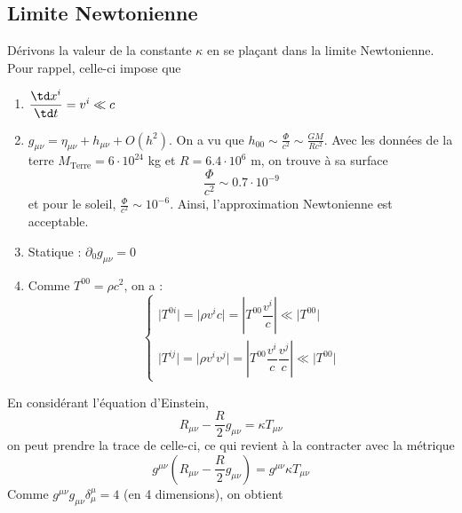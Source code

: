 \subsection{Limite Newtonienne}
Dérivons la valeur de la constante $\kappa$ en se plaçant dans la limite Newtonienne. Pour rappel, celle-ci impose que
\begin{theoremframe}
\begin{enumerate}
    \item $\dfrac{\td x^{i}}{\td t} = v^i \ll c$
    \item $g_{\mu \nu} = \eta_{\mu \nu} + h_{\mu \nu} + O(h^2)$. On a vu que $h_{00} \sim \frac{\Phi}{c^2} \sim \frac{GM}{R c^2}$. Avec les données de la terre $M_{\text{Terre}} = 6 \cdot10^{24}$ kg et $R = 6.4 \cdot 10^6$ m, on trouve à sa surface
    \begin{equation}
        \frac{\Phi}{c^2} \sim 0.7 \cdot 10^{-9}
    \end{equation}
    et pour le soleil, $\frac{\Phi}{c^2} \sim 10^{-6}$. Ainsi, l'approximation Newtonienne est acceptable.
    \item Statique : $\partial_0 g_{\mu \nu} = 0$ 
    \item Comme $T^{00} = \rho c^2$, on a :
    \begin{equation}
        \left\{
        \begin{array}{l}
            \vert T^{0i} \vert = \vert\rho v^i c \vert=\left| T^{00} \dfrac{v^i}{c} \right|\ll \vert T^{00}\vert   \\
            \vert T^{ij}\vert = \vert\rho v^i v^j\vert =\left| T^{00} \dfrac{v^i}{c}\dfrac{v^j}{c} \right|\ll \vert T^{00} \vert
        \end{array}
        \right.
    \end{equation}
\end{enumerate}
\end{theoremframe}
En considérant l'équation d'Einstein, 
\begin{equation}
    R_{\mu \nu} - \frac{R}{2}g_{\mu \nu} = \kappa T_{\mu \nu}
    \label{eq:Einstein pour kappa}
\end{equation}
on peut prendre la trace de celle-ci, ce qui revient à la contracter avec la métrique 
\begin{equation}
    g^{\mu \nu}\left(R_{\mu \nu} - \frac{R}{2}g_{\mu \nu}\right) = g^{\mu \nu}\kappa T_{\mu \nu}
    \label{eq:Einstein pour trouver kappa 1}
\end{equation}
Comme $g^{\mu \nu}g_{\mu \nu} \delta^{\mu}_{\mu} = 4$ (en 4 dimensions), on obtient
